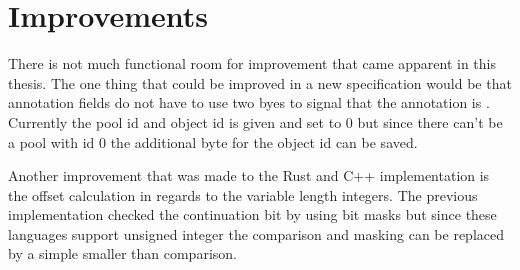 \documentclass[thesis]{subfiles}
\begin{document}

\section{ Improvements}
  There is not much functional room for improvement that came apparent in this thesis.
  The one thing that could be improved in a new specification would be that annotation fields do not have to use two byes to signal that the annotation is .
  Currently the pool id and object id is given and set to 0 but since there can't be a pool with id 0 the additional byte for the object id can be saved.

  Another improvement that was made to the Rust and C++ implementation is the offset calculation in regards to the variable length integers.
  The previous implementation checked the continuation bit by using bit masks but since these languages support unsigned integer the comparison and masking can be replaced by a simple smaller than comparison.
\end{document}
